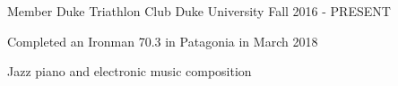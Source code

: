 


\begin{cventries}


\cventry
{Member} %
{Duke Triathlon Club} %
{Duke University} %
{Fall 2016 - PRESENT} %
{ %
\begin{cvitems}
\item {Completed an Ironman 70.3 in Patagonia in March 2018}
\end{cvitems}
}
\cventry
{} %
{Jazz piano and electronic music composition} %
{} %
{} %
{ %
}


\end{cventries}